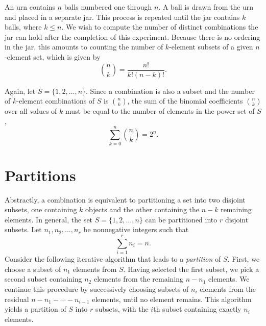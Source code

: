 \begin{example}
An urn contains $n$ balls numbered one through $n$.
A ball is drawn from the urn and placed in a separate jar.
This process is repeated until the jar contains $k$ balls, where $k \leq n$.
We wish to compute the number of distinct combinations the jar can hold after the completion of this experiment.
Because there is no ordering in the jar, this amounts to counting the number of $k$-element subsets of a given $n$-element set, which is given by
\begin{equation*}
\binom{n}{k} = \frac{n!}{k! (n-k)!}.
\end{equation*}
\end{example}

Again, let $S = \{1, 2, \ldots, n\}$.
Since a combination is also a subset and the number of $k$-element combinations of $S$ is $\binom{n}{k}$, the sum of the binomial coefficients $\binom{n}{k}$ over all values of $k$ must be equal to the number of elements in the power set of $S$, 
\begin{equation*}
\sum_{k=0}^n \binom{n}{k} = 2^n .
\end{equation*}


\section{Partitions}

Abstractly, a combination is equivalent to partitioning a set into two disjoint subsets, one containing $k$ objects and the other containing the $n-k$ remaining elements.
In general, the set $S = \{ 1, 2, \ldots, n \}$ can be partitioned into $r$ disjoint subsets.
Let $n_1, n_2, \ldots, n_r$ be nonnegative integers such that
\begin{equation*}
\sum_{i = 1}^r n_i = n.
\end{equation*}
Consider the following iterative algorithm that leads to a \emph{partition} of $S$. 
First, we choose a subset of $n_1$ elements from $S$.
Having selected the first subset, we pick a second subset containing $n_2$ elements from the remaining $n - n_1$ elements.
We continue this procedure by successively choosing subsets of $n_i$ elements from the residual $n - n_1 - \cdots - n_{i-1}$ elements, until no element remains.
This algorithm yields a partition of $S$ into $r$ subsets, with the $i$th subset containing exactly $n_i$ elements.

